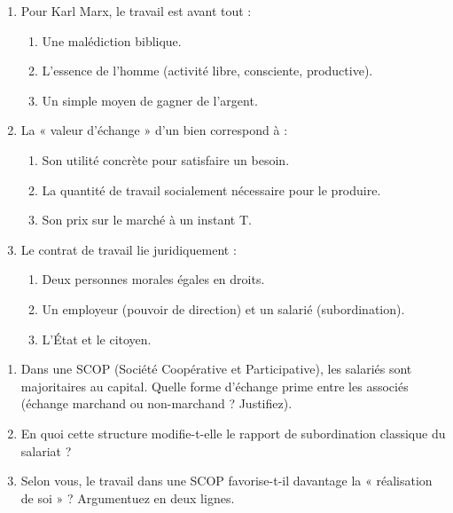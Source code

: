 \documentclass[11pt]{article}
\begin{document}
\begin{exercice}
\begin{enumerate}
    \item Pour Karl Marx, le travail est avant tout :
    \begin{enumerate}
        \item Une malédiction biblique.
        \item L'essence de l'homme (activité libre, consciente, productive).
        \item Un simple moyen de gagner de l'argent.
    \end{enumerate}
    \item La « valeur d'échange » d'un bien correspond à :
    \begin{enumerate}
        \item Son utilité concrète pour satisfaire un besoin.
        \item La quantité de travail socialement nécessaire pour le produire.
        \item Son prix sur le marché à un instant T.
    \end{enumerate}
    \item Le contrat de travail lie juridiquement :
    \begin{enumerate}
        \item Deux personnes morales égales en droits.
        \item Un employeur (pouvoir de direction) et un salarié (subordination).
        \item L'État et le citoyen.
    \end{enumerate}
\end{enumerate}
\end{exercice}

\begin{exercice}
\begin{enumerate}
    \item Dans une SCOP (Société Coopérative et Participative), les salariés sont majoritaires au capital. Quelle forme d'échange prime entre les associés (échange marchand ou non-marchand ? Justifiez).
    \item En quoi cette structure modifie-t-elle le rapport de subordination classique du salariat ?
    \item Selon vous, le travail dans une SCOP favorise-t-il davantage la « réalisation de soi » ? Argumentuez en deux lignes.
\end{enumerate}
\end{exercice}
\end{document}
